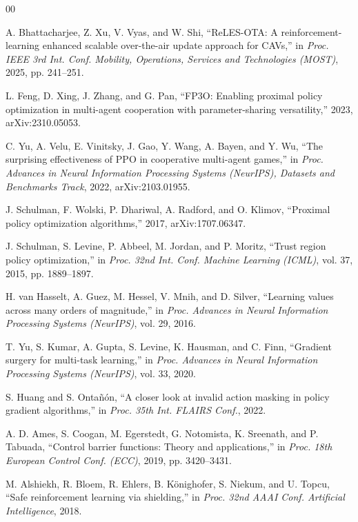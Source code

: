 \documentclass[conference]{IEEEtran}
\begin{document}
\begin{thebibliography}{00}

A. Bhattacharjee, Z. Xu, V. Vyas, and W. Shi, ``ReLES-OTA: A
reinforcement-learning enhanced scalable over-the-air update approach for CAVs,''
in \textit{Proc. IEEE 3rd Int. Conf. Mobility, Operations, Services and Technologies
(MOST)}, 2025, pp. 241--251.

L. Feng, D. Xing, J. Zhang, and G. Pan, ``FP3O: Enabling proximal
policy optimization in multi-agent cooperation with parameter-sharing versatility,''
2023, arXiv:2310.05053.

C. Yu, A. Velu, E. Vinitsky, J. Gao, Y. Wang, A. Bayen, and Y. Wu,
``The surprising effectiveness of PPO in cooperative multi-agent games,'' in
\textit{Proc. Advances in Neural Information Processing Systems (NeurIPS), Datasets
and Benchmarks Track}, 2022, arXiv:2103.01955.

J. Schulman, F. Wolski, P. Dhariwal, A. Radford, and O. Klimov,
``Proximal policy optimization algorithms,'' 2017, arXiv:1707.06347.

J. Schulman, S. Levine, P. Abbeel, M. Jordan, and P. Moritz,
``Trust region policy optimization,'' in \textit{Proc. 32nd Int. Conf. Machine
Learning (ICML)}, vol. 37, 2015, pp. 1889--1897.

H. van Hasselt, A. Guez, M. Hessel, V. Mnih, and D. Silver,
``Learning values across many orders of magnitude,'' in \textit{Proc. Advances
in Neural Information Processing Systems (NeurIPS)}, vol. 29, 2016.

T. Yu, S. Kumar, A. Gupta, S. Levine, K. Hausman, and C. Finn,
``Gradient surgery for multi-task learning,'' in \textit{Proc. Advances in
Neural Information Processing Systems (NeurIPS)}, vol. 33, 2020.

S. Huang and S. Onta{\~n}{\'o}n,
``A closer look at invalid action masking in policy gradient algorithms,''
in \textit{Proc. 35th Int. FLAIRS Conf.}, 2022.

A. D. Ames, S. Coogan, M. Egerstedt, G. Notomista, K. Sreenath, and P. Tabuada,
``Control barrier functions: Theory and applications,'' in \textit{Proc.
18th European Control Conf. (ECC)}, 2019, pp. 3420--3431.

M. Alshiekh, R. Bloem, R. Ehlers, B. K{\"o}nighofer, S. Niekum, and U. Topcu,
``Safe reinforcement learning via shielding,'' in \textit{Proc. 32nd AAAI Conf.
Artificial Intelligence}, 2018.


\end{thebibliography}
\end{document}
